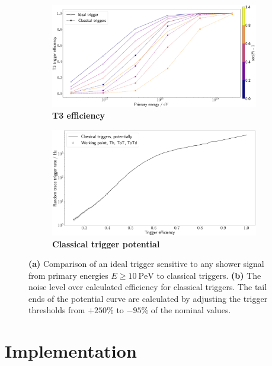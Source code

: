 \begin{figure}
	\begin{subfigure}[b]{0.49\textwidth}
		\centering
		\includegraphics[width=\textwidth]{./plots/ideal_t3_efficiency.png}
		\caption{\textbf{T3 efficiency}}
		\label{fig:ideal-efficiency-comparison}
	\end{subfigure}
	\hfill
	\begin{subfigure}[b]{0.49\textwidth}
		\centering
		\includegraphics[width=\textwidth]{./plots/classical_trigger_ROC.png}
		\caption{\textbf{Classical trigger potential}}
		\label{fig:classical-trigger-roc}
	\end{subfigure}
	\caption{\textbf{(a)} Comparison of an ideal trigger sensitive to any shower signal from primary energies $E\geq\SI{10}{\peta\electronvolt}$ to classical 
    triggers. \textbf{(b)} The noise level over calculated efficiency for classical triggers. The tail ends of the potential curve are calculated by adjusting the
    trigger thresholds from $+250\%$ to $-95\%$ of the nominal values.}
\end{figure}

\section{Implementation}
\label{sec:implementation}

